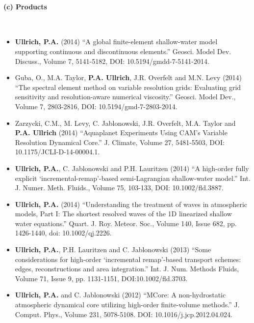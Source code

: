 \documentclass[11pt]{article}
\begin{document}
\vspace{0.3cm}
\paragraph{\large (c) Products}\ \\
\vspace{-0.3cm}
\begin{itemize}
\item \textbf{Ullrich, P.A.} (2014) ``A global finite-element shallow-water model supporting continuous and discontinuous elements.'' Geosci. Model Dev. Discuss., Volume 7, 5141-5182, DOI: 10.5194/gmdd-7-5141-2014. 

\item Guba, O., M.A. Taylor, \textbf{P.A. Ullrich}, J.R. Overfelt and M.N. Levy (2014) ``The spectral element method on variable resolution grids: Evaluating grid sensitivity and resolution-aware numerical viscosity.'' Geosci. Model Dev., Volume 7, 2803-2816, DOI: 10.5194/gmd-7-2803-2014.

\item Zarzycki, C.M., M. Levy, C. Jablonowski, J.R. Overfelt, M.A. Taylor and \textbf{P.A. Ullrich} (2014) ``Aquaplanet Experiments Using CAM's Variable Resolution Dynamical Core.'' J. Climate, Volume 27, 5481-5503, DOI: 10.1175/JCLI-D-14-00004.1.

\item \textbf{Ullrich, P.A.}, C. Jablonowski and P.H. Lauritzen (2014) ``A high-order fully explicit `incremental-remap'-based semi-Lagrangian shallow-water model.'' Int. J. Numer. Meth. Fluids., Volume 75, 103-133, DOI: 10.1002/fld.3887.

\item \textbf{Ullrich, P.A.} (2014) ``Understanding the treatment of waves in atmospheric models, Part I: The shortest resolved waves of the 1D linearized shallow water equations.'' Quart. J. Roy. Meteor. Soc., Volume 140, Issue 682, pp. 1426-1440, doi: 10.1002/qj.2226.  

\item \textbf{Ullrich, P.A.}, P.H. Lauritzen and C. Jablonowski (2013) {``Some considerations for high-order `incremental remap'-based transport schemes: edges, reconstructions and area integration.''}  Int. J. Num. Methods Fluids, Volume 71, Issue 9, pp. 1131-1151, DOI:10.1002/fld.3703.

\item \textbf{Ullrich, P.A.} and C. Jablonowski (2012) {``MCore: A non-hydrostatic atmospheric dynamical core utilizing high-order finite-volume methods.''}  J. Comput. Phys., Volume 231, 5078-5108. DOI: 10.1016/j.jcp.2012.04.024.


\end{itemize}
\end{document}

